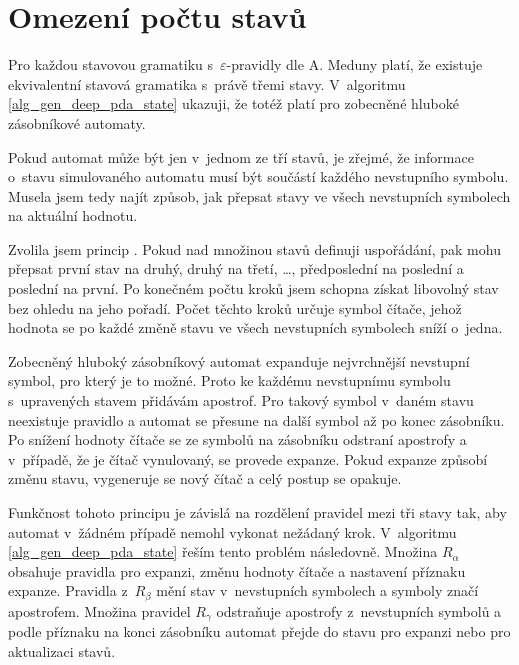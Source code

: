 \section{Omezení počtu stavů}

Pro každou stavovou gramatiku s~$\varepsilon$-pravidly dle A. Meduny \cite{Meduna:StateGrammars} platí, že existuje ekvivalentní stavová gramatika s~právě třemi stavy. V~algoritmu \ref{alg_gen_deep_pda_state} ukazuji, že totéž platí pro zobecněné hluboké zásobníkové automaty.

Pokud automat může být jen v~jednom ze tří stavů, je zřejmé, že informace o~stavu simulovaného automatu musí být součástí každého nevstupního symbolu. Musela jsem tedy najít způsob, jak přepsat stavy ve všech nevstupních symbolech na aktuální hodnotu. 

Zvolila jsem princip . Pokud nad množinou stavů definuji uspořádání, pak mohu přepsat první stav na druhý, druhý na třetí, \dots, předposlední na poslední a poslední na první. Po konečném počtu kroků jsem schopna získat libovolný stav bez ohledu na jeho pořadí. Počet těchto kroků určuje symbol čítače, jehož hodnota se po každé změně stavu ve všech nevstupních symbolech sníží o~jedna. 

Zobecněný hluboký zásobníkový automat expanduje nejvrchnější nevstupní symbol, pro který je to možné. Proto ke každému nevstupnímu symbolu s~upravených stavem přidávám apostrof. Pro takový symbol v~daném stavu neexistuje pravidlo a automat se přesune na další symbol až po konec zásobníku. Po snížení hodnoty čítače se ze symbolů na zásobníku odstraní apostrofy a v~případě, že je čítač vynulovaný, se provede expanze. Pokud expanze způsobí změnu stavu, vygeneruje se nový čítač a celý postup se opakuje.

Funkčnost tohoto principu je závislá na rozdělení pravidel mezi tři stavy tak, aby automat v~žádném případě nemohl vykonat nežádaný krok. V~algoritmu \ref{alg_gen_deep_pda_state} řeším tento problém následovně. Množina $R_{\alpha}$ obsahuje pravidla pro expanzi, změnu hodnoty čítače a nastavení příznaku expanze. Pravidla z~$R_{\beta}$ mění stav v~nevstupních symbolech a symboly značí apostrofem. Množina pravidel $R_{\gamma}$ odstraňuje apostrofy z~nevstupních symbolů a podle příznaku na konci zásobníku automat přejde do stavu pro expanzi nebo pro aktualizaci stavů.

